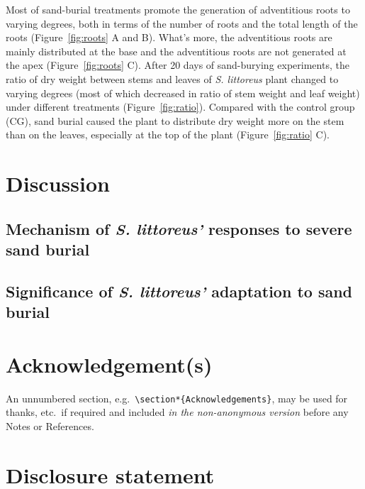 \documentclass[]{interact}
\theoremstyle{plain}%
\theoremstyle{definition}
\theoremstyle{remark}
\begin{document}
Most of sand-burial treatments promote the generation of adventitious roots to varying degrees, both in terms of the number of roots and the total length of the roots (Figure~\ref{fig:roots} A and B).
What's more, the adventitious roots are mainly distributed at the base and the adventitious roots are not generated at the apex (Figure~\ref{fig:roots} C).
After 20 days of sand-burying experiments, the ratio of dry weight between stems and leaves of \textit{S. littoreus} plant changed to varying degrees (most of which decreased in ratio of stem weight and leaf weight) under different treatments (Figure~\ref{fig:ratio}).
Compared with the control group (CG), sand burial caused the plant to distribute dry weight more on the stem than on the leaves, especially at the top of the plant (Figure~\ref{fig:ratio} C).

\section{Discussion}

\subsection{Mechanism of \textit{S. littoreus'} responses to severe sand burial}

\subsection{Significance of \textit{S. littoreus'} adaptation to sand burial}


\section*{Acknowledgement(s)}

An unnumbered section, e.g.\ \verb"\section*{Acknowledgements}", may be used for thanks, etc.\ if required and included \emph{in the non-anonymous version} before any Notes or References.


\section*{Disclosure statement}
\end{document}
